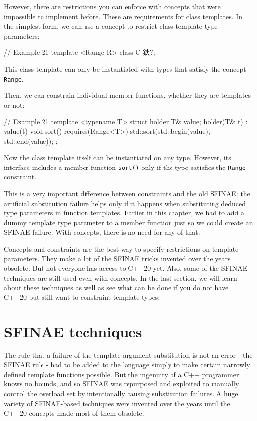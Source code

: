 However, there are restrictions you can enforce with concepts that were impossible to implement before. These are requirements for class templates. In the simplest form, we can use a concept to restrict class template type parameters:

\begin{code}
// Example 21
template <Range R> class C { 鈥?};
\end{code}

This class template can only be instantiated with types that satisfy the concept \texttt{Range}.

Then, we can constrain individual member functions, whether they are templates or not:

\begin{code}
// Example 21
template <typename T> struct holder {
  T& value;
  holder(T& t) : value(t) {}
  void sort() requires(Range<T>) {
    std::sort(std::begin(value), std::end(value));
  }
};
\end{code}

Now the class template itself can be instantiated on any type. However, its interface includes a member function \texttt{sort()} only if the type satisfies the \texttt{Range} constraint.

This is a very important difference between constraints and the old SFINAE: the artificial substitution failure helps only if it happens when substituting deduced type parameters in function templates. Earlier in this chapter, we had to add a dummy template type parameter to a member function just so we could create an SFINAE failure. With concepts, there is no need for any of that.

Concepts and constraints are the best way to specify restrictions on template parameters. They make a lot of the SFINAE tricks invented over the years obsolete. But not everyone has access to C++20 yet. Also, some of the SFINAE techniques are still used even with concepts. In the last section, we will learn about these techniques as well as see what can be done if you do not have C++20 but still want to constraint template types.

\section{SFINAE techniques}

The rule that a failure of the template argument substitution is not an error - the SFINAE rule - had to be added to the language simply to make certain narrowly defined template functions possible. But the ingenuity of a C++ programmer knows no bounds, and so SFINAE was repurposed and exploited to manually control the overload set by intentionally causing substitution failures. A huge variety of SFINAE-based techniques were invented over the years until the C++20 concepts made most of them obsolete.


